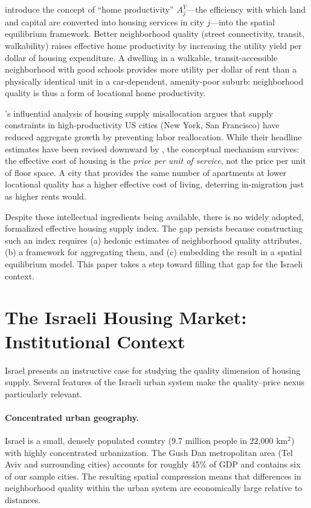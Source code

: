\documentclass[12pt,a4paper]{article}
\begin{document}
\citet{albouy2018} introduce the concept of ``home productivity'' $A_j^Y$—the
efficiency with which land and capital are converted into housing services in
city $j$—into the spatial equilibrium framework.  Better neighborhood quality
(street connectivity, transit, walkability) raises effective home productivity
by increasing the utility yield per dollar of housing expenditure.  A dwelling
in a walkable, transit-accessible neighborhood with good schools provides more
utility per dollar of rent than a physically identical unit in a car-dependent,
amenity-poor suburb: neighborhood quality is thus a form of locational home
productivity.

\citet{hsieh2019}'s influential analysis of housing supply misallocation argues
that supply constraints in high-productivity US cities (New York, San
Francisco) have reduced aggregate growth by preventing labor reallocation.
While their headline estimates have been revised downward by
\citet{greaney2023}, the conceptual mechanism survives: the effective cost of
housing is the \textit{price per unit of service}, not the price per unit of
floor space.  A city that provides the same number of apartments at lower
locational quality has a higher effective cost of living, deterring in-migration
just as higher rents would.

Despite these intellectual ingredients being available, there is no widely
adopted, formalized effective housing supply index.  The gap persists because
constructing such an index requires (a) hedonic estimates of neighborhood
quality attributes, (b) a framework for aggregating them, and (c) embedding the
result in a spatial equilibrium model.  This paper takes a step toward filling
that gap for the Israeli context.

\section{The Israeli Housing Market: Institutional Context}
\label{sec:context}

Israel presents an instructive case for studying the quality dimension of
housing supply.  Several features of the Israeli urban system make the
quality–price nexus particularly relevant.

\paragraph{Concentrated urban geography.}  Israel is a small, densely populated
country (9.7 million people in 22,000 km$^2$) with highly concentrated
urbanization.  The Gush Dan metropolitan area (Tel Aviv and surrounding cities)
accounts for roughly 45\% of GDP and contains six of our sample cities.  The
resulting spatial compression means that differences in neighborhood quality
within the urban system are economically large relative to distances.
\end{document}
